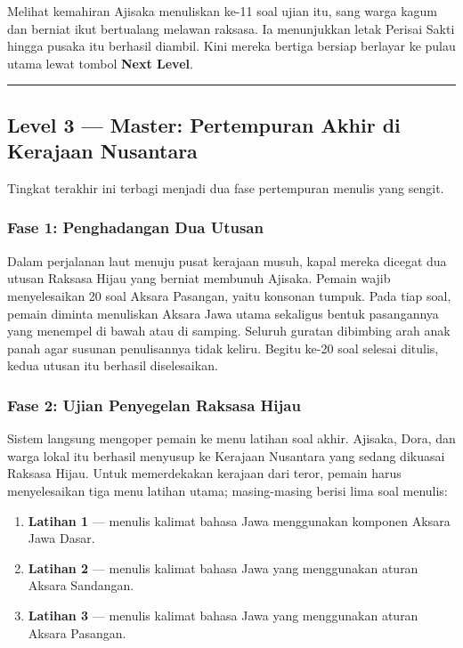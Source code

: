 \documentclass[
  11pt,
]{article}
\providecommand{\tightlist}{%
  \setlength{\itemsep}{0pt}\setlength{\parskip}{0pt}}
\begin{document}
Melihat kemahiran Ajisaka menuliskan ke-11 soal ujian itu, sang warga
kagum dan berniat ikut bertualang melawan raksasa. Ia menunjukkan letak
Perisai Sakti hingga pusaka itu berhasil diambil. Kini mereka bertiga
bersiap berlayar ke pulau utama lewat tombol \textbf{Next Level}.

\begin{center}\rule{0.5\linewidth}{0.5pt}\end{center}

\subsection{Level 3 --- Master: Pertempuran Akhir di Kerajaan
Nusantara}\label{level-3-master-pertempuran-akhir-di-kerajaan-nusantara}

Tingkat terakhir ini terbagi menjadi dua fase pertempuran menulis yang
sengit.

\subsubsection{Fase 1: Penghadangan Dua
Utusan}\label{fase-1-penghadangan-dua-utusan}

Dalam perjalanan laut menuju pusat kerajaan musuh, kapal mereka dicegat
dua utusan Raksasa Hijau yang berniat membunuh Ajisaka. Pemain wajib
menyelesaikan 20 soal Aksara Pasangan, yaitu konsonan tumpuk. Pada tiap
soal, pemain diminta menuliskan Aksara Jawa utama sekaligus bentuk
pasangannya yang menempel di bawah atau di samping. Seluruh guratan
dibimbing arah anak panah agar susunan penulisannya tidak keliru. Begitu
ke-20 soal selesai ditulis, kedua utusan itu berhasil diselesaikan.

\subsubsection{Fase 2: Ujian Penyegelan Raksasa
Hijau}\label{fase-2-ujian-penyegelan-raksasa-hijau}

Sistem langsung mengoper pemain ke menu latihan soal akhir. Ajisaka,
Dora, dan warga lokal itu berhasil menyusup ke Kerajaan Nusantara yang
sedang dikuasai Raksasa Hijau. Untuk memerdekakan kerajaan dari teror,
pemain harus menyelesaikan tiga menu latihan utama; masing-masing berisi
lima soal menulis:

\begin{enumerate}
\def\labelenumi{\arabic{enumi}.}
\tightlist
\item
  \textbf{Latihan 1} --- menulis kalimat bahasa Jawa menggunakan
  komponen Aksara Jawa Dasar.
\item
  \textbf{Latihan 2} --- menulis kalimat bahasa Jawa yang menggunakan
  aturan Aksara Sandangan.
\item
  \textbf{Latihan 3} --- menulis kalimat bahasa Jawa yang menggunakan
  aturan Aksara Pasangan.
\end{enumerate}
\end{document}
